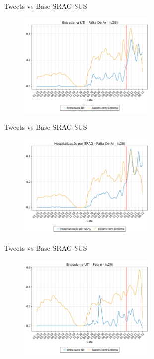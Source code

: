 \documentclass[aspectratio=169]{beamer}                    %
\begin{document}
\begin{frame}{Tweets vs Base SRAG-SUS}
    \begin{figure}
        \centering
        \includegraphics[width=0.6\textwidth]{srag_twitter_s28_ent.png}
        \label{fig:srag_twitter_s28_ent}
    \end{figure}
\end{frame}

\begin{frame}{Tweets vs Base SRAG-SUS}
    \begin{figure}
        \centering
        \includegraphics[width=0.6\textwidth]{srag_twitter_s28_int.png}
        \label{fig:srag_twitter_s28_int}
    \end{figure}
\end{frame}

\begin{frame}{Tweets vs Base SRAG-SUS}
    \begin{figure}
        \centering
        \includegraphics[width=0.6\textwidth]{srag_twitter_s29_ent.png}
        \label{fig:srag_twitter_s29_ent}
    \end{figure}
\end{frame}
\end{document}
